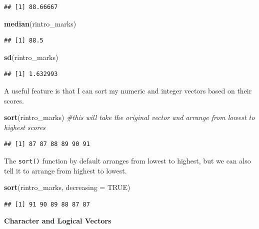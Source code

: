 \documentclass[
]{book}
\newenvironment{Shaded}{\begin{snugshade}}{\end{snugshade}}
\newcommand{\AttributeTok}[1]{\textcolor[rgb]{0.13,0.29,0.53}{#1}}
\newcommand{\CommentTok}[1]{\textcolor[rgb]{0.56,0.35,0.01}{\textit{#1}}}
\newcommand{\ConstantTok}[1]{\textcolor[rgb]{0.56,0.35,0.01}{#1}}
\newcommand{\FunctionTok}[1]{\textcolor[rgb]{0.13,0.29,0.53}{\textbf{#1}}}
\newcommand{\NormalTok}[1]{#1}
\begin{document}
\begin{verbatim}
## [1] 88.66667
\end{verbatim}

\begin{Shaded}
\begin{Highlighting}[]
\FunctionTok{median}\NormalTok{(rintro\_marks)}
\end{Highlighting}
\end{Shaded}

\begin{verbatim}
## [1] 88.5
\end{verbatim}

\begin{Shaded}
\begin{Highlighting}[]
\FunctionTok{sd}\NormalTok{(rintro\_marks)}
\end{Highlighting}
\end{Shaded}

\begin{verbatim}
## [1] 1.632993
\end{verbatim}

A useful feature is that I can sort my numeric and integer vectors based on their scores.

\begin{Shaded}
\begin{Highlighting}[]
\FunctionTok{sort}\NormalTok{(rintro\_marks) }\CommentTok{\#this will take the original vector and arrange from lowest to highest scores}
\end{Highlighting}
\end{Shaded}

\begin{verbatim}
## [1] 87 87 88 89 90 91
\end{verbatim}

The \texttt{sort()} function by default arranges from lowest to highest, but we can also tell it to arrange from highest to lowest.

\begin{Shaded}
\begin{Highlighting}[]
\FunctionTok{sort}\NormalTok{(rintro\_marks, }\AttributeTok{decreasing =} \ConstantTok{TRUE}\NormalTok{) }
\end{Highlighting}
\end{Shaded}

\begin{verbatim}
## [1] 91 90 89 88 87 87
\end{verbatim}

\textbf{Character and Logical Vectors}
\end{document}
